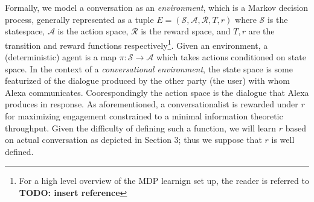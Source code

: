 \documentclass{article} %
\theoremstyle{named}
\def\scripta{{\mathcal A}}
\def\scriptr{{\mathcal R}}
\def\scripts{{\mathcal S}}
\begin{document}
Formally, we model a conversation as an \emph{environment}, which is a Markov decision process, generally represented as a tuple $E=(\scripts, \scripta, \scriptr, T, r)$ where $\scripts$ is the statespace, $\scripta$ is the action space, $\scriptr$ is the reward space, and $T, r$ are the transition and reward functions respectively\footnote{For a high level overview of the MDP learnign set up, the reader is referred to \textbf{ TODO: insert reference}}. Given an environment, a (deterministic) agent is a map $\pi: \scripts \to \scripta$ which takes actions conditioned on state space. In the context of a \emph{conversational environment}, the state space is some featurized of the dialogue produced by the other party (the user) with whom Alexa communicates. Coorespondingly the action space is the dialogue that Alexa produces in response. As aforementioned, a conversationalist is rewarded under $r$ for maximizing engagement constrained to a minimal information theoretic throughput. Given the difficulty of defining such a function, we will learn $r$ based on actual conversation as depicted in Section 3; thus we suppose that $r$ is well defined.
\end{document}
